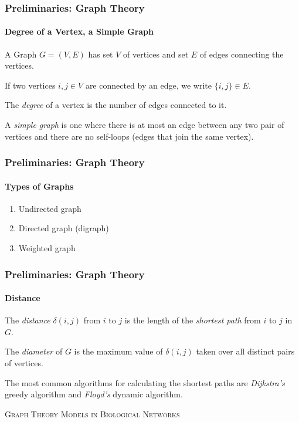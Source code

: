 \documentclass[aspectratio=43,leqno]{beamer}
\begin{document}
\begin{frame}
  \frametitle{Preliminaries: Graph Theory}
  \framesubtitle{Degree of a Vertex, a Simple Graph}
  
  A Graph $G = (V, E)$ has set $V$ of vertices and set $E$ of edges connecting the vertices. \pause

  If two vertices $i, j \in V$ are connected by an edge, we write $\{i, j\} \in E$. \pause

  The \emph{degree} of a vertex is the number of edges connected to it. \pause

  A \emph{simple graph} is one where there is at most an edge between any two pair of vertices and there are no self-loops (edges that join the same vertex).
\end{frame}

\begin{frame}
  \frametitle{Preliminaries: Graph Theory}
  \framesubtitle{Types of Graphs}
  
\begin{enumerate}
\item\label{item:6} Undirected graph 
\item\label{item:20} Directed graph (digraph) 
\item\label{item:24} Weighted graph
\end{enumerate}

\end{frame}

\begin{frame}
  \frametitle{Preliminaries: Graph Theory}
  \framesubtitle{Distance}

  The \emph{distance} $\delta(i,j)$ from $i$ to $j$ is the length of the \emph{shortest path} from $i$ to $j$ in $G$. \pause

  The \emph{diameter} of $G$ is the maximum value of $\delta(i, j)$ taken over all distinct pairs of vertices. \pause

  The most common algorithms for calculating the shortest paths are \emph{Dijkstra's} greedy algorithm and \emph{Floyd's} dynamic algorithm.
\end{frame}


\begin{frame}
  \vfill
\begin{center}
  \textsc{Graph Theory Models in Biological Networks}
\end{center}
  \vfill
\end{frame}
\end{document}
